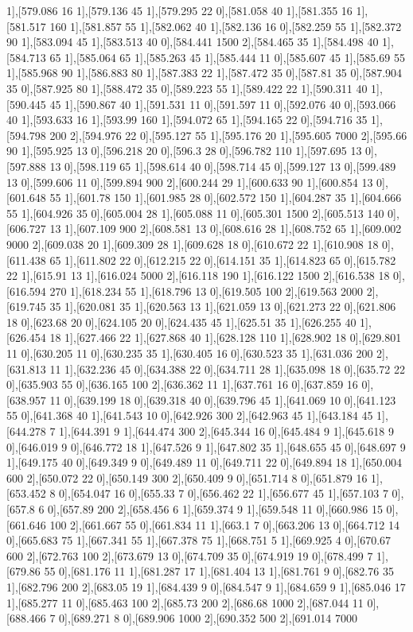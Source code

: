 {1],[579.086 16 1],[579.136 45 1],[579.295 22 0],[581.058 40 1],[581.355 16 1],[581.517 160 1],[581.857 55 1],[582.062 40 1],[582.136 16 0],[582.259 55 1],[582.372 90 1],[583.094 45 1],[583.513 40 0],[584.441 1500 2],[584.465 35 1],[584.498 40 1],[584.713 65 1],[585.064 65 1],[585.263 45 1],[585.444 11 0],[585.607 45 1],[585.69 55 1],[585.968 90 1],[586.883 80 1],[587.383 22 1],[587.472 35 0],[587.81 35 0],[587.904 35 0],[587.925 80 1],[588.472 35 0],[589.223 55 1],[589.422 22 1],[590.311 40 1],[590.445 45 1],[590.867 40 1],[591.531 11 0],[591.597 11 0],[592.076 40 0],[593.066 40 1],[593.633 16 1],[593.99 160 1],[594.072 65 1],[594.165 22 0],[594.716 35 1],[594.798 200 2],[594.976 22 0],[595.127 55 1],[595.176 20 1],[595.605 7000 2],[595.66 90 1],[595.925 13 0],[596.218 20 0],[596.3 28 0],[596.782 110 1],[597.695 13 0],[597.888 13 0],[598.119 65 1],[598.614 40 0],[598.714 45 0],[599.127 13 0],[599.489 13 0],[599.606 11 0],[599.894 900 2],[600.244 29 1],[600.633 90 1],[600.854 13 0],[601.648 55 1],[601.78 150 1],[601.985 28 0],[602.572 150 1],[604.287 35 1],[604.666 55 1],[604.926 35 0],[605.004 28 1],[605.088 11 0],[605.301 1500 2],[605.513 140 0],[606.727 13 1],[607.109 900 2],[608.581 13 0],[608.616 28 1],[608.752 65 1],[609.002 9000 2],[609.038 20 1],[609.309 28 1],[609.628 18 0],[610.672 22 1],[610.908 18 0],[611.438 65 1],[611.802 22 0],[612.215 22 0],[614.151 35 1],[614.823 65 0],[615.782 22 1],[615.91 13 1],[616.024 5000 2],[616.118 190 1],[616.122 1500 2],[616.538 18 0],[616.594 270 1],[618.234 55 1],[618.796 13 0],[619.505 100 2],[619.563 2000 2],[619.745 35 1],[620.081 35 1],[620.563 13 1],[621.059 13 0],[621.273 22 0],[621.806 18 0],[623.68 20 0],[624.105 20 0],[624.435 45 1],[625.51 35 1],[626.255 40 1],[626.454 18 1],[627.466 22 1],[627.868 40 1],[628.128 110 1],[628.902 18 0],[629.801 11 0],[630.205 11 0],[630.235 35 1],[630.405 16 0],[630.523 35 1],[631.036 200 2],[631.813 11 1],[632.236 45 0],[634.388 22 0],[634.711 28 1],[635.098 18 0],[635.72 22 0],[635.903 55 0],[636.165 100 2],[636.362 11 1],[637.761 16 0],[637.859 16 0],[638.957 11 0],[639.199 18 0],[639.318 40 0],[639.796 45 1],[641.069 10 0],[641.123 55 0],[641.368 40 1],[641.543 10 0],[642.926 300 2],[642.963 45 1],[643.184 45 1],[644.278 7 1],[644.391 9 1],[644.474 300 2],[645.344 16 0],[645.484 9 1],[645.618 9 0],[646.019 9 0],[646.772 18 1],[647.526 9 1],[647.802 35 1],[648.655 45 0],[648.697 9 1],[649.175 40 0],[649.349 9 0],[649.489 11 0],[649.711 22 0],[649.894 18 1],[650.004 600 2],[650.072 22 0],[650.149 300 2],[650.409 9 0],[651.714 8 0],[651.879 16 1],[653.452 8 0],[654.047 16 0],[655.33 7 0],[656.462 22 1],[656.677 45 1],[657.103 7 0],[657.8 6 0],[657.89 200 2],[658.456 6 1],[659.374 9 1],[659.548 11 0],[660.986 15 0],[661.646 100 2],[661.667 55 0],[661.834 11 1],[663.1 7 0],[663.206 13 0],[664.712 14 0],[665.683 75 1],[667.341 55 1],[667.378 75 1],[668.751 5 1],[669.925 4 0],[670.67 600 2],[672.763 100 2],[673.679 13 0],[674.709 35 0],[674.919 19 0],[678.499 7 1],[679.86 55 0],[681.176 11 1],[681.287 17 1],[681.404 13 1],[681.761 9 0],[682.76 35 1],[682.796 200 2],[683.05 19 1],[684.439 9 0],[684.547 9 1],[684.659 9 1],[685.046 17 1],[685.277 11 0],[685.463 100 2],[685.73 200 2],[686.68 1000 2],[687.044 11 0],[688.466 7 0],[689.271 8 0],[689.906 1000 2],[690.352 500 2],[691.014 7000 }
